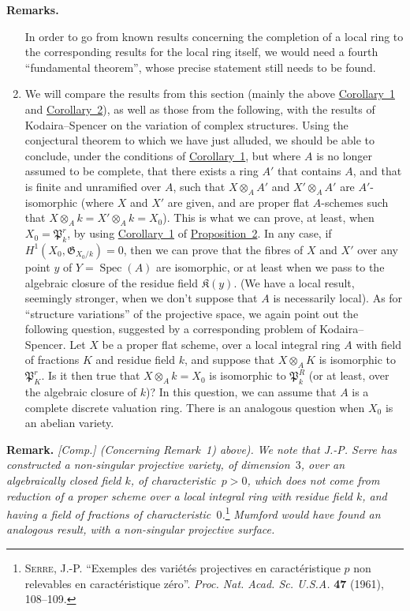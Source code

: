 \documentclass{article}
\newenvironment{rmenv}[1]
  {\phantomsection\par\medskip\noindent\textbf{#1.}\rmfamily}
  {\medskip}
\newcommand{\fk}{\mathfrak}
\newcommand{\kres}{\mathfrak{K}}
\DeclareMathOperator{\Spec}{Spec}
\begin{document}
\begin{rmenv}{Remarks}
\begin{enumerate}[1)]
      In order to go from known results concerning the completion of a local ring to the corresponding results for the local ring itself, we would need a fourth ``fundamental theorem'', whose precise statement still needs to be found.
    \item We will compare the results from this section (mainly the above \hyperref[theorem9corollary1]{Corollary~1} and \hyperref[theorem9corollary2]{Corollary~2}), as well as those from the following, with the results of Kodaira--Spencer on the variation of complex structures.
      Using the conjectural theorem to which we have just alluded, we should be able to conclude, under the conditions of \hyperref[theorem9corollary1]{Corollary~1}, but where $A$ is no longer assumed to be complete, that there exists a ring $A'$ that contains $A$, and that is finite and unramified over $A$, such that $X\otimes_AA'$ and $X'\otimes_AA'$ are $A'$-isomorphic (where $X$ and $X'$ are given, and are proper flat $A$-schemes such that $X\otimes_Ak=X'\otimes_Ak=X_0$).
      This is what we can prove, at least, when $X_0=\fk{P}_k^r$, by using \hyperref[proposition2corollary1]{Corollary~1} of \hyperref[proposition2]{Proposition~2}.
      In any case, if $H^1(X_0,\fk{G}_{X_0/k})=0$, then we can prove that the fibres of $X$ and $X'$ over any point $y$ of $Y=\Spec(A)$ are isomorphic, or at least when we pass to the algebraic closure of the residue field $\kres(y)$.
      (We have a local result, seemingly stronger, when we don't suppose that $A$ is necessarily local).
      As for ``structure variations'' of the projective space, we again point out the following question, suggested by a corresponding problem of Kodaira--Spencer.
      Let $X$ be a proper flat scheme, over a local integral ring $A$ with field of fractions $K$ and residue field $k$, and suppose that $X\otimes_AK$ is isomorphic to $\fk{P}_K^r$.
      Is it then true that $X\otimes_Ak=X_0$ is isomorphic to $\fk{P}_k^R$ (or at least, over the algebraic closure of $k$)?
      In this question, we can assume that $A$ is a complete discrete valuation ring.
      There is an analogous question when $X_0$ is an abelian variety.
  \end{enumerate}
\end{rmenv}

\begin{rmenv}{Remark}
  \emph{[Comp.] (Concerning Remark~1) above).}
  \emph{We note that J.-P. Serre has constructed a non-singular projective variety, of dimension~$3$, over an algebraically closed field $k$, of characteristic~$p>0$, which does not come from reduction of a proper scheme over a local integral ring with residue field $k$, and having a field of fractions of characteristic~$0$.}\footnote{\textsc{Serre, J.-P.} ``Exemples des vari\'{e}t\'{e}s projectives en caract\'{e}ristique $p$ non relevables en caract\'{e}ristique z\'{e}ro''. \emph{Proc. Nat. Acad. Sc. U.S.A.} \textbf{47} (1961), 108--109.}
  \emph{Mumford would have found an analogous result, with a non-singular projective \emph{surface}.}
\end{rmenv}
\end{document}
